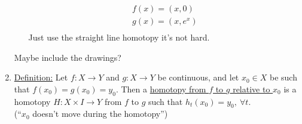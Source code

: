 \begin{enumerate}
\begin{enumerate}
\begin{align*}
                        f(x)=(x,0)\\
                        g(x)=(x,e^x)\\
                    \end{align*}
                    Just use the straight line homotopy it's not hard.
            \end{enumerate}
            Maybe include the drawings?
        \item \underline{Definition:} Let $f:X\rightarrow Y$ and $g: X\rightarrow Y$ be continuous,
            and let $x_0 \in X$ be such that $f(x_0)=g(x_0)=y_0$. Then a
            \underline{homotopy from $f$ to $g$ relative to $x_0$} is a homotopy $H:X\times I \rightarrow Y$
            from $f$ to $g$ such that $h_t(x_0)=y_0,\ \forall t$.\\
            (``$x_0$ doesn't move during the homotopy'')
    \end{enumerate}
